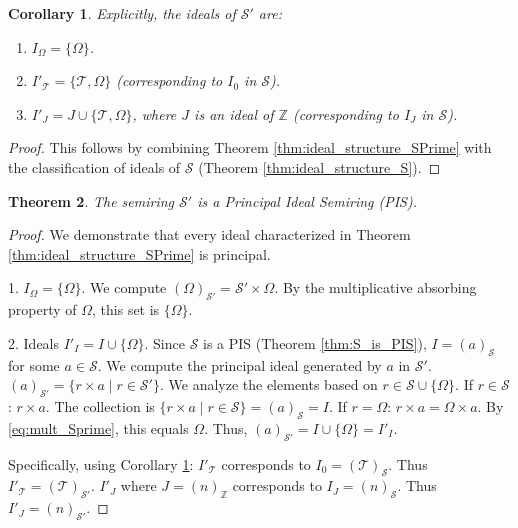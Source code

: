 \documentclass[11pt, a4paper]{article}
\theoremstyle{plain}
\newtheorem{theorem}{Theorem}[section]
\newtheorem{corollary}[theorem]{Corollary}
\theoremstyle{definition}
\numberwithin{equation}{section}
\newcommand{\Z}{\mathbb{Z}}
\newcommand{\Tobj}{\mathcal{T}} %
\newcommand{\OmegaObj}{\Omega} %
\newcommand{\SemiringS}{\mathcal{S}}
\newcommand{\SemiringSPrime}{\mathcal{S}'}
\begin{document}
\begin{corollary}\label{cor:explicit_ideals_SPrime}
Explicitly, the ideals of $\SemiringSPrime$ are:
\begin{enumerate}
    \item $I_{\OmegaObj} = \{\OmegaObj\}$.
    \item $I'_{\Tobj} = \{\Tobj, \OmegaObj\}$ (corresponding to $I_0$ in $\SemiringS$).
    \item $I'_J = J \cup \{\Tobj, \OmegaObj\}$, where $J$ is an ideal of $\Z$ (corresponding to $I_J$ in $\SemiringS$).
\end{enumerate}
\end{corollary}
\begin{proof}
This follows by combining Theorem \ref{thm:ideal_structure_SPrime} with the classification of ideals of $\SemiringS$ (Theorem \ref{thm:ideal_structure_S}).
\end{proof}

\begin{theorem}\label{thm:SPrime_is_PIS}
The semiring $\SemiringSPrime$ is a Principal Ideal Semiring (PIS).
\end{theorem}
\begin{proof}
We demonstrate that every ideal characterized in Theorem \ref{thm:ideal_structure_SPrime} is principal.

1. $I_{\OmegaObj} = \{\OmegaObj\}$. We compute $(\OmegaObj)_{\SemiringSPrime} = \SemiringSPrime\times\OmegaObj$. By the multiplicative absorbing property of $\OmegaObj$, this set is $\{\OmegaObj\}$.

2. Ideals $I'_I = I \cup \{\OmegaObj\}$. Since $\SemiringS$ is a PIS (Theorem \ref{thm:S_is_PIS}), $I=(a)_{\SemiringS}$ for some $a \in \SemiringS$.
We compute the principal ideal generated by $a$ in $\SemiringSPrime$.
$(a)_{\SemiringSPrime} = \{r\times a \mid r \in \SemiringSPrime\}$.
We analyze the elements based on $r \in \SemiringS \cup \{\OmegaObj\}$.
If $r \in \SemiringS$: $r\times a$. The collection is $\{r\times a \mid r \in \SemiringS\} = (a)_{\SemiringS} = I$.
If $r=\OmegaObj$: $r\times a = \OmegaObj\times a$. By \eqref{eq:mult_Sprime}, this equals $\OmegaObj$.
Thus, $(a)_{\SemiringSPrime} = I \cup \{\OmegaObj\} = I'_I$.

Specifically, using Corollary \ref{cor:explicit_ideals_SPrime}:
$I'_{\Tobj}$ corresponds to $I_0=(\Tobj)_{\SemiringS}$. Thus $I'_{\Tobj} = (\Tobj)_{\SemiringSPrime}$.
$I'_J$ where $J=(n)_{\Z}$ corresponds to $I_J=(n)_{\SemiringS}$. Thus $I'_J = (n)_{\SemiringSPrime}$.
\end{proof}
\end{document}
